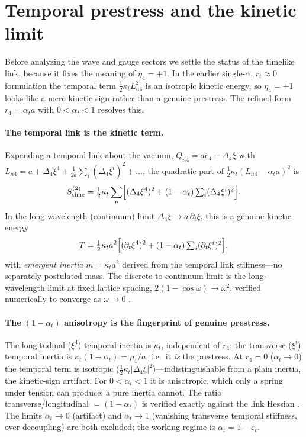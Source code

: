 \section{Temporal prestress and the kinetic limit}
\label{sec:temporal}

Before analyzing the wave and gauge sectors we settle the status of the timelike link,
because it fixes the meaning of $\eta_4=+1$. In the earlier single-$\alpha$, $r_t\approx 0$
formulation the temporal term $\tfrac12\kappa_t L_{n4}^2$ is an isotropic kinetic energy, so
$\eta_4=+1$ looks like a mere kinetic sign rather than a genuine prestress. The refined form
$r_4=\alpha_t a$ with $0<\alpha_t<1$ resolves this.

\paragraph{The temporal link is the kinetic term.} Expanding a temporal link about the
vacuum, $Q_{n4}=a\hat e_4+\Delta_4\xi$ with $L_{n4}=a+\Delta_4\xi^4+\tfrac1{2a}\sum_i(\Delta_4\xi^i)^2+\dots$,
the quadratic part of $\tfrac12\kappa_t(L_{n4}-\alpha_t a)^2$ is
\begin{equation}
  S^{(2)}_{\text{time}}
  = \tfrac12\kappa_t\sum_n\Bigl[(\Delta_4\xi^4)^2+(1-\alpha_t)\textstyle\sum_i(\Delta_4\xi^i)^2\Bigr].
  \label{eq:s2time}
\end{equation}
In the long-wavelength (continuum) limit $\Delta_4\xi\to a\,\partial_t\xi$, this is a genuine
kinetic energy
\begin{equation}
  T=\tfrac12\kappa_t a^2\Bigl[(\partial_t\xi^4)^2+(1-\alpha_t)\textstyle\sum_i(\partial_t\xi^i)^2\Bigr],
  \label{eq:kinetic}
\end{equation}
with \emph{emergent inertia} $m=\kappa_t a^2$ derived from the temporal link stiffness---no
separately postulated mass. The discrete-to-continuum limit is the long-wavelength limit at
fixed lattice spacing, $2(1-\cos\omega)\to\omega^2$, verified numerically to converge as
$\omega\to 0$ \citep{repo}.

\paragraph{The $(1-\alpha_t)$ anisotropy is the fingerprint of genuine prestress.} The
longitudinal ($\xi^4$) temporal inertia is $\kappa_t$, independent of $r_4$; the transverse
($\xi^i$) temporal inertia is $\kappa_t(1-\alpha_t)=\rho_4/a$, i.e.\ it \emph{is} the
prestress. At $r_4=0$ ($\alpha_t\to 0$) the temporal term is isotropic
($\tfrac12\kappa_t|\Delta_4\xi|^2$)---indistinguishable from a plain inertia, the
kinetic-sign artifact. For $0<\alpha_t<1$ it is anisotropic, which only a spring under
tension can produce; a pure inertia cannot. The ratio transverse/longitudinal $=(1-\alpha_t)$
is verified exactly against the link Hessian \citep{repo}. The limits $\alpha_t\to 0$
(artifact) and $\alpha_t\to 1$ (vanishing transverse temporal stiffness, over-decoupling)
are both excluded; the working regime is $\alpha_t=1-\varepsilon_t$.

